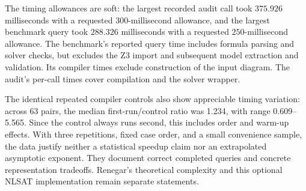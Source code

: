 The timing allowances are soft: the largest recorded audit call took
$375.926$ milliseconds with a requested $300$-millisecond allowance,
and the largest benchmark query took $288.326$ milliseconds with a
requested $250$-millisecond allowance.  The benchmark's reported query
time includes formula parsing and solver checks, but excludes the Z3
import and subsequent model extraction and validation.  Its compiler
times exclude construction of the input diagram.  The audit's per-call
times cover compilation and the solver wrapper.

The identical repeated compiler controls also show appreciable timing
variation: across 63 pairs, the median first-run/control ratio was 1.234,
with range 0.609--5.565.  Since the control always runs second, this
includes order and warm-up effects.  With three repetitions, fixed case
order, and a small convenience sample, the data justify neither a
statistical speedup claim nor an extrapolated asymptotic exponent.
They document correct completed queries and concrete representation
tradeoffs.  Renegar's theoretical complexity and this optional NLSAT
implementation remain separate statements.
